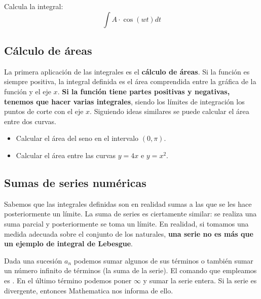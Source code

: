 \documentclass[a4paper,10pt, draft]{article}
\newcommand{\com}[1]{\textbf{\color{blue}{#1}}}
\newenvironment{ejer}{\begin{tcolorbox}[center title, title=Ejercicios,
fonttitle=\sffamily\bfseries,colback=blue!5,colframe=orange]}{\end{tcolorbox}}
\begin{document}
\begin{ejer}

Calcula la integral:
$$
\int A \cdot \cos(wt) dt
$$

\end{ejer}  \newpage

\subsection{Cálculo de áreas}

La primera aplicación de las integrales es el \textbf{cálculo de áreas}. Si la función es siempre positiva, la integral definida es el área comprendida entre la gráfica de la función  y el eje $x$. \textbf{Si la función tiene partes positivas y negativas, tenemos que hacer varias integrales}, siendo los límites de integración los puntos de corte con el eje $x$. Siguiendo ideas similares se puede calcular el área entre dos curvas.

\begin{ejer}

\begin{itemize}

\item Calcular el área del seno en el intervalo $(0,\pi)$.

\item Calcular el área entre las curvas $y=4x$ e $y=x^2$.

\end{itemize}


\end{ejer}  \newpage


\subsection{Sumas de series numéricas}

Sabemos que las integrales definidas son en realidad sumas a las que se les hace posteriormente un límite. La suma de series es ciertamente similar: se realiza una suma parcial y posteriormente se toma un límite. En realidad, si tomamos una medida adecuada sobre el conjunto de los naturales, \textbf{una serie no es más que un ejemplo de integral de Lebesgue}.


Dada una sucesión $a_n$ podemos sumar algunos de sus términos o también sumar un número infinito de términos (la suma de la serie). El comando que empleamos es \com{Sum[a,\{i,imin,imax\}]}. En el último término podemos poner $\infty$ y sumar la serie entera. Si la serie es divergente, entonces Mathematica nos informa de ello.
\end{document}
